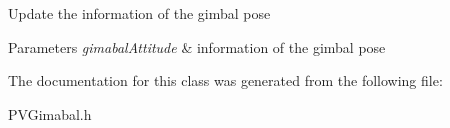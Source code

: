 Update the information of the gimbal pose


\begin{DoxyParams}{Parameters}
{\em gimabal\+Attitude} & information of the gimbal pose \\
\hline
\end{DoxyParams}


The documentation for this class was generated from the following file\+:\begin{DoxyCompactItemize}
\item 
P\+V\+Gimabal.\+h\end{DoxyCompactItemize}
